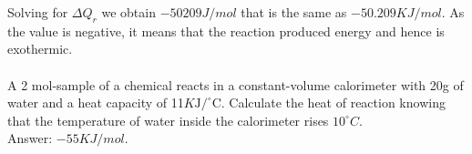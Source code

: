 \documentclass[main.tex]{subfiles}
\begin{document}
\begin{description}
\begin{example}
Solving for $\Delta Q_{r}$ we obtain $-50209J/mol$ that is the same as $-50.209KJ/mol$. As the value is negative, it means that the reaction produced energy and hence is exothermic.
\\
\faDiamond\ \\
A 2 mol-sample of a chemical reacts in a  constant-volume calorimeter with 20g of water and a heat capacity of 11$K\text{J}/^{\circ}\text{C}$. Calculate the heat of reaction knowing that the temperature of water inside the calorimeter rises $10^{\circ}C$.
\\
\flushright Answer: $-55KJ/mol$.
\end{example}%

\end{description}
  
  
  
\end{document}
